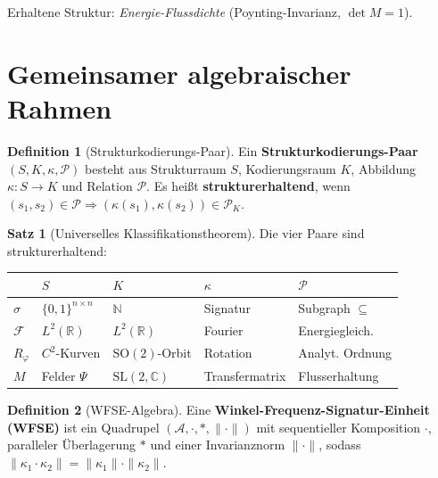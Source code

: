 ﻿\documentclass[a4paper,12pt]{scrreprt}
\theoremstyle{definition}
\newtheorem{definition}{Definition}[section]
\newtheorem{satz}{Satz}[section]
\begin{document}
Erhaltene Struktur: \emph{Energie-Flussdichte} (Poynting-Invarianz,
$\det M = 1$).

\section{Gemeinsamer algebraischer Rahmen}
\label{sec:nf1_rahmen}

\begin{definition}[Strukturkodierungs-Paar]
  Ein \textbf{Strukturkodierungs-Paar} $(S, K, \kappa, \mathcal{P})$
  besteht aus Strukturraum $S$, Kodierungsraum $K$,
  Abbildung $\kappa: S \to K$ und Relation $\mathcal{P}$.
  Es heißt \textbf{strukturerhaltend}, wenn
  $(s_1,s_2)\in\mathcal{P} \Rightarrow (\kappa(s_1),\kappa(s_2))\in\mathcal{P}_K$.
\end{definition}

\begin{satz}[Universelles Klassifikationstheorem]
  \label{satz:nf1_usk}
  Die vier Paare sind strukturerhaltend:

  \smallskip
  \begin{center}\small
  \begin{tabular}{lllll}
  \toprule
  & $S$ & $K$ & $\kappa$ & $\mathcal{P}$ \\
  \midrule
  $\sigma$ & $\{0,1\}^{n\times n}$ & $\mathbb{N}$ & Signatur & Subgraph $\subseteq$ \\
  $\mathcal{F}$ & $L^2(\mathbb{R})$ & $L^2(\mathbb{R})$ & Fourier & Energiegleich. \\
  $R_\varphi$ & $C^2$-Kurven & $\mathrm{SO}(2)$-Orbit & Rotation & Analyt. Ordnung \\
  $M$ & Felder $\Psi$ & $\mathrm{SL}(2,\mathbb{C})$ & Transfermatrix & Flusserhaltung \\
  \bottomrule
  \end{tabular}
  \end{center}
\end{satz}

\begin{definition}[WFSE-Algebra]
  Eine \textbf{Winkel-Frequenz-Signatur-Einheit (WFSE)} ist ein Quadrupel
  $(\mathcal{A}, \cdot, *, \|\cdot\|)$ mit sequentieller Komposition
  $\cdot$, paralleler Überlagerung $*$ und einer Invarianznorm
  $\|\cdot\|$, sodass
  $\|\kappa_1 \cdot \kappa_2\| = \|\kappa_1\|\cdot\|\kappa_2\|$.
\end{definition}
\end{document}
